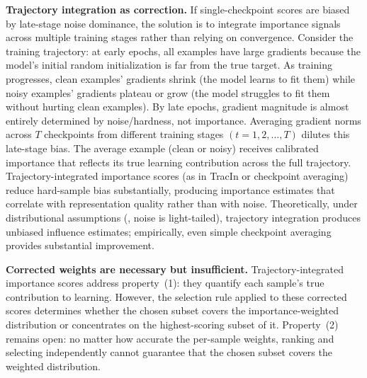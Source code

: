 \begin{foldable}
  \textbf{Trajectory integration as correction.}
  If single-checkpoint scores are biased by late-stage noise dominance, the solution is to integrate importance signals across multiple training stages rather than relying on convergence.
  Consider the training trajectory: at early epochs, all examples have large gradients because the model's initial random initialization is far from the true target.
  As training progresses, clean examples' gradients shrink (the model learns to fit them) while noisy examples' gradients plateau or grow (the model struggles to fit them without hurting clean examples).
  By late epochs, gradient magnitude is almost entirely determined by noise/hardness, not importance.
  Averaging gradient norms across $T$ checkpoints from different training stages $(t=1, 2, \ldots, T)$ dilutes this late-stage bias.
  The average example (clean or noisy) receives calibrated importance that reflects its true learning contribution across the full trajectory.
  Trajectory-integrated importance scores (as in TracIn or checkpoint averaging) reduce hard-sample bias substantially, producing importance estimates that correlate with representation quality rather than with noise.
  Theoretically, under distributional assumptions (\eg, noise is light-tailed), trajectory integration produces unbiased influence estimates; empirically, even simple checkpoint averaging provides substantial improvement.
\end{foldable}

\begin{foldable}
  \textbf{Corrected weights are necessary but insufficient.}
  Trajectory-integrated importance scores address property~(1): they quantify each sample's true contribution to learning.
  However, the selection rule applied to these corrected scores determines whether the chosen subset covers the importance-weighted distribution or concentrates on the highest-scoring subset of it.
  Property~(2) remains open: no matter how accurate the per-sample weights, ranking and selecting independently cannot guarantee that the chosen subset covers the weighted distribution.
\end{foldable}
